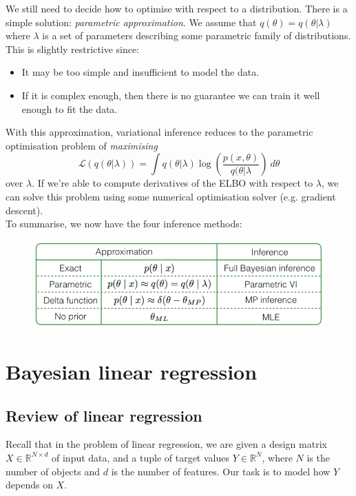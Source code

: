 \newpage
We still need to decide how to optimise with respect to a distribution. There is a simple solution: \textit{parametric approximation}. We assume that $q(\theta) = q(\theta | \lambda)$ where $\lambda$ is a set of parameters describing some parametric family of distributions.\\

This is slightly restrictive since:
\begin{itemize}
\item It may be too simple and insufficient to model the data.
\item If it is complex enough, then there is no guarantee we can train it well enough to fit the data.
\end{itemize}

With this approximation, variational inference reduces to the parametric optimisation problem of \textit{maximising}
\begin{equation*}
\mathcal{L}(q(\theta | \lambda)) = \int q(\theta | \lambda) \log\left( \frac{p(x, \theta)}{q(\theta | \lambda} \right)\ d\theta
\end{equation*}
over $\lambda$. If we're able to compute derivatives of the ELBO with respect to $\lambda$, we can solve this problem using some numerical optimisation solver (e.g. gradient descent). \\

To summarise, we now have the four inference methods:
\begin{figure}[H]
\centering
\includegraphics[scale=0.4]{allmethodsummary.png}
\end{figure}



\newpage
\section{Bayesian linear regression}
\subsection{Review of linear regression}
Recall that in the problem of linear regression, we are given a design matrix $X \in \mathbb{R}^{N \times d}$ of input data, and a tuple of target values $Y \in \mathbb{R}^N$, where $N$ is the number of objects and $d$ is the number of features. Our task is to model how $Y$ depends on $X$.\\

